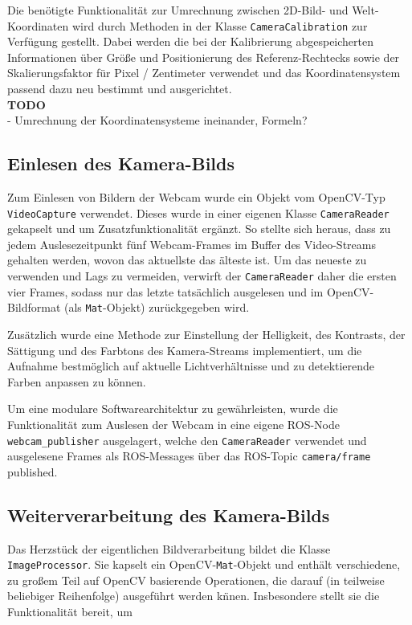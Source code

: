 Die ben\"otigte Funktionalit\"at zur Umrechnung zwischen 2D-Bild- und Welt-Koordinaten wird durch
Methoden in der Klasse \texttt{CameraCalibration} zur Verf\"ugung gestellt. Dabei werden die bei der Kalibrierung
abgespeicherten Informationen \"uber Gr\"o\ss e und Positionierung des Referenz-Rechtecks sowie der
Skalierungsfaktor f\"ur Pixel / Zentimeter verwendet
und das Koordinatensystem passend dazu neu bestimmt und ausgerichtet.\\

\textbf{TODO}\\
- Umrechnung der Koordinatensysteme ineinander, Formeln?\\

\subsection{Einlesen des Kamera-Bilds}

Zum Einlesen von Bildern der Webcam wurde ein Objekt vom OpenCV-Typ \texttt{VideoCapture} verwendet.
Dieses wurde in einer eigenen Klasse \texttt{CameraReader} gekapselt und um Zusatzfunktionalit\"at
erg\"anzt. So stellte sich heraus, dass zu jedem Auslesezeitpunkt f\"unf Webcam-Frames im Buffer des
Video-Streams gehalten werden, wovon das aktuellste das \"alteste ist. Um das neueste zu verwenden
und Lags zu vermeiden, verwirft der \texttt{CameraReader} daher die ersten vier Frames, sodass nur das letzte
tats\"achlich ausgelesen und im OpenCV-Bildformat (als \texttt{Mat}-Objekt) zur\"uckgegeben wird.

Zus\"atzlich wurde eine Methode zur Einstellung der Helligkeit, des Kontrasts, der S\"attigung und des
Farbtons des Kamera-Streams implementiert, um die Aufnahme bestm\"oglich auf aktuelle Lichtverh\"altnisse und zu
detektierende Farben anpassen zu k\"onnen.

Um eine modulare Softwarearchitektur zu gew\"ahrleisten, wurde die Funktionalit\"at zum Auslesen der Webcam
in eine eigene ROS-Node \texttt{webcam\_publisher} ausgelagert, welche den
\texttt{CameraReader} verwendet und ausgelesene Frames als ROS-Messages \"uber das ROS-Topic
\texttt{camera/frame} published.

\subsection{Weiterverarbeitung des Kamera-Bilds}

Das Herzst\"uck der eigentlichen Bildverarbeitung bildet die Klasse \texttt{ImageProcessor}. Sie kapselt
ein OpenCV-\texttt{Mat}-Objekt und enth\"alt verschiedene, zu gro\ss em Teil auf OpenCV basierende
Operationen, die darauf (in teilweise beliebiger
Reihenfolge) ausgef\"uhrt werden k\"nnen. Insbesondere stellt sie die Funktionalit\"at bereit, um


